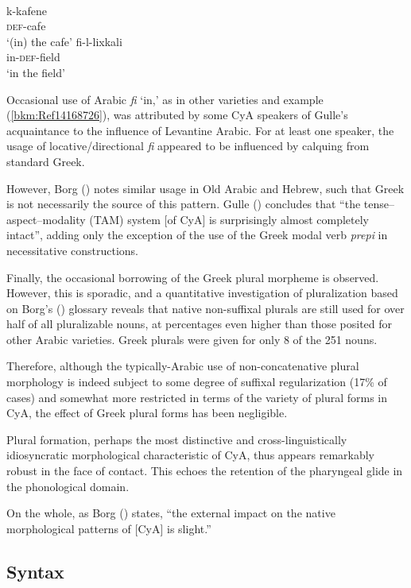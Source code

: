 \documentclass[output=paper]{langsci/langscibook}
\begin{document}
\ea
{}\\
\ea \gll k-kafene\\
     \textsc{def}-cafe  \\
\glt ‘(in) the cafe’
\ex \gll fi-l-lixkali\\
     in-\textsc{def}-field\\
\glt ‘in the field’\label{bkm:Ref14168726} \label{field}
\z
\z

Occasional use of Arabic \textit{fi} ‘in,’ as in other varieties and example (\ref{bkm:Ref14168726}), was attributed by some CyA speakers of Gulle’s acquaintance to the influence of Levantine Arabic. For at least one speaker, the usage of locative/directional \textit{fi} appeared to be influenced by calquing from standard Greek. 

However, Borg (\citeyear[3]{Borg2004}) notes similar usage in Old Arabic and Hebrew, such that Greek is not necessarily the source of this pattern. Gulle (\citeyear[47]{Gulle2016}) concludes that “the tense--aspect--modality (TAM) system [of CyA] is surprisingly almost completely intact”, adding only the exception of the use of the Greek modal verb \textit{prepi} in necessitative constructions. 

Finally, the occasional borrowing of the Greek plural morpheme is observed. However, this is sporadic, and a quantitative investigation of pluralization based on Borg's (\citeyear{Borg2004}) glossary \citep{Walter2017} reveals that native non-suffixal plurals are still used for over half of all pluralizable nouns, at percentages even higher than those posited for other Arabic varieties. Greek plurals were given for only 8 of the 251 nouns. 

Therefore, although the typically-Arabic use of non-concatenative plural morphology is indeed subject to some degree of suffixal regularization (17\% of cases) and somewhat more restricted in terms of the variety of plural forms in CyA, the effect of Greek plural forms has been negligible. 

Plural formation, perhaps the most distinctive and cross-linguistically idiosyncratic morphological characteristic of CyA, thus appears remarkably robust in the face of contact. This echoes the retention of the pharyngeal glide in the phonological domain. 

On the whole, as Borg (\citeyear[57]{Borg1994}) states, “the external impact on the native morphological patterns of [CyA] is slight.” 

\subsection{Syntax}
\end{document}
